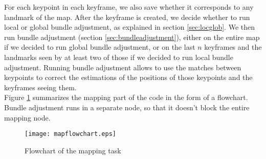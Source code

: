 For each keypoint in each keyframe, we also save whether it corresponds to any landmark of the map. After the keyframe is created, we decide whether to run local or global bundle adjustment, as explained in section  \ref{sec:locglob}. We then run bundle adjustment (section \ref{sec:bundleadjustment}), either on the entire map if we decided to run global bundle adjustment, or on the last $n$ keyframes and the landmarks seen by at least two of those if we decided to run local bundle adjustment. Running bundle adjustment allows to use the matches between keypoints to correct the estimations of the positions of those keypoints and the keyframes seeing them.\\

Figure \ref{fig:mapflowchart} summarizes the mapping part of the code in the form of a flowchart. Bundle adjustment runs in a separate node, so that it doesn't block the entire mapping node.

\begin{figure}[H]
  \centering
  \texttt{[image: mapflowchart.eps]}
  \caption{Flowchart of the mapping task}
  \label{fig:mapflowchart}
\end{figure}
